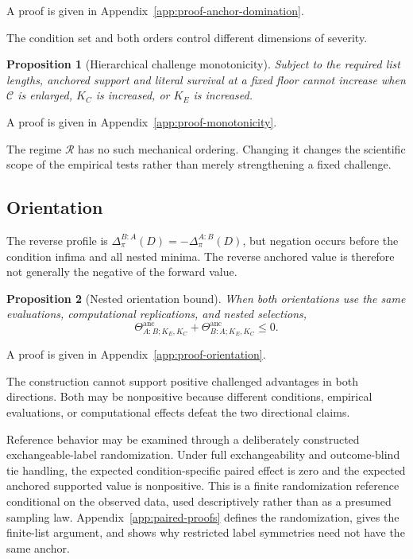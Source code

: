 \documentclass[11pt]{article}
\newcommand{\Regime}{\mathcal{R}}
\newcommand{\CSet}{\mathcal{C}}
\newcommand{\Thetaanc}{\Theta^{\mathrm{anc}}}
\newtheorem{proposition}{Proposition}
\theoremstyle{remark}
\begin{document}
A proof is given in Appendix~\ref{app:proof-anchor-domination}.

The condition set and both orders control different dimensions of severity.

\begin{proposition}[Hierarchical challenge monotonicity]
\label{prop:monotonicity}
Subject to the required list lengths, anchored support and literal survival at
a fixed floor cannot increase when $\CSet$ is enlarged, $K_C$ is increased, or
$K_E$ is increased.
\end{proposition}

A proof is given in Appendix~\ref{app:proof-monotonicity}.

The regime $\Regime$ has no such mechanical ordering. Changing it changes the
scientific scope of the empirical tests rather than merely strengthening a
fixed challenge.

\subsection{Orientation}

The reverse profile is
$\Delta^{B:A}_\pi(D)=-\Delta^{A:B}_\pi(D)$, but negation occurs before the
condition infima and all nested minima. The reverse anchored value is therefore
not generally the negative of the forward value.

\begin{proposition}[Nested orientation bound]
\label{prop:orientation}
When both orientations use the same evaluations, computational replications,
and nested selections,
\begin{equation}
\Thetaanc_{A:B;K_E,K_C}
+
\Thetaanc_{B:A;K_E,K_C}
\leq0.
\label{eq:orientation}
\end{equation}
\end{proposition}

A proof is given in Appendix~\ref{app:proof-orientation}.

The construction cannot support positive challenged advantages in both
directions. Both may be nonpositive because different conditions, empirical
evaluations, or computational effects defeat the two directional claims.

Reference behavior may be examined through a deliberately constructed
exchangeable-label randomization. Under full exchangeability and outcome-blind
tie handling, the expected condition-specific paired effect is zero and the
expected anchored supported value is nonpositive. This is a finite
randomization reference conditional on the observed data, used descriptively
rather than as a presumed sampling law. Appendix~\ref{app:paired-proofs}
defines the randomization, gives the finite-list argument, and shows why
restricted label symmetries need not have the same anchor.
\end{document}
